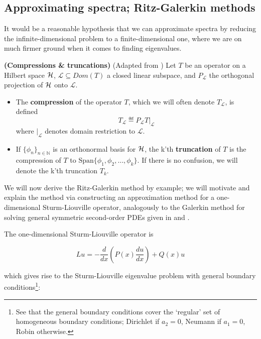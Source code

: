 \documentclass[../main.tex]{subfiles}
\begin{document}
\subsection{Approximating spectra; Ritz-Galerkin methods}

It would be a reasonable hypothesis that we can approximate spectra by reducing
the infinite-dimensional problem to a finite-dimensional one, where we are on
much firmer ground when it comes to finding eigenvalues.

\begin{definition}{\textbf{(Compressions \& truncations)}}
(Adapted from \parencite{davies1995spectral})
Let $T$ be an operator on a Hilbert space $\mathcal{H}$, $\mathcal{L} \subseteq
Dom(T)$ a closed linear subspace, and $P_\mathcal{L}$ the orthogonal
projection of $\mathcal{H}$ onto $\mathcal{L}$.
\begin{itemize}
\item The \textbf{compression} of the operator $T$, which we will often denote
      $T_\mathcal{L}$, is defined 
      $$T_\mathcal{L} \eqdef P_\mathcal{L} T\big|_{\mathcal{L}}$$
      where $\big|_{\mathcal{L}}$ denotes domain restriction to $\mathcal{L}$. 
\item If $\{\phi_n\}_{n \in \mathbb{N}}$ is an orthonormal basis
      for $\mathcal{H}$, the k'th \textbf{truncation} of $T$ is the compression
      of $T$ to $\text{Span}\{\phi_1, \phi_2, \hdots, \phi_k\}$. If
      there is no confusion, we will denote the k'th truncation $T_k$.
\end{itemize}
\end{definition}

We will now derive the Ritz-Galerkin method by example; we will motivate and
explain the method via constructing an approximation method for a
one-dimensional Sturm-Liouville operator,
analogously to the Galerkin method for solving general symmetric second-order
PDEs given in \cite{suli2003introduction} and \cite{pryce1993numerical}. 

The one-dimensional Sturm-Liouville operator is

$$Lu = - \frac{d}{dx}(P(x)\frac{du}{dx}) + Q(x)u$$ 

which gives rise to the Sturm-Liouville eigenvalue problem with general boundary
conditions\footnote{See that the general boundary conditions cover the `regular'
set of homogeneous boundary conditions; Dirichlet if $a_2 = 0$, Neumann if $a_1
= 0$, Robin otherwise.}:
\end{document}
